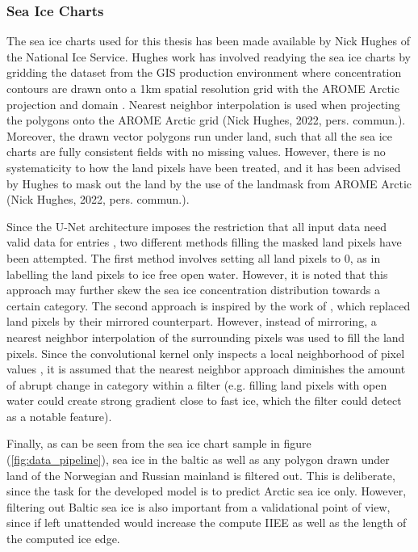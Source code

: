 \documentclass[../main/thesis]{subfiles}
\begin{document}
\subsubsection{Sea Ice Charts}
\label{sec:data_seaicecharts}
The sea ice charts used for this thesis has been made available by Nick Hughes of the National Ice Service. Hughes work has involved readying the sea ice charts by gridding the dataset from the GIS production environment \citep{Dinessen2020} where concentration contours are drawn onto a 1km spatial resolution grid with the AROME Arctic projection and domain \citep{Mueller2017}. Nearest neighbor interpolation is used when projecting the polygons onto the AROME Arctic grid (Nick Hughes, 2022, pers. commun.). Moreover, the drawn vector polygons run under land, such that all the sea ice charts are fully consistent fields with no missing values. However, there is no systematicity to how the land pixels have been treated, and it has been advised by Hughes to mask out the land by the use of the landmask from AROME Arctic (Nick Hughes, 2022, pers. commun.).

Since the U-Net architecture imposes the restriction that all input data need valid data for entries \citep{Ronneberger2015}, two different methods filling the masked land pixels have been attempted. The first method involves setting all land pixels to 0, as in labelling the land pixels to ice free open water. However, it is noted that this approach may further skew the sea ice concentration distribution towards a certain category. The second approach is inspired by the work of \citet{Wang2017}, which replaced land pixels by their mirrored counterpart. However, instead of mirroring, a nearest neighbor interpolation of the surrounding pixels was used to fill the land pixels. Since the convolutional kernel only inspects a local neighborhood of pixel values \citep{Yamashita2018}, it is assumed that the nearest neighbor approach diminishes the amount of abrupt change in category within a filter (e.g. filling land pixels with open water could create strong gradient close to fast ice, which the filter could detect as a notable feature).

Finally, as can be seen from the sea ice chart sample in figure (\ref{fig:data_pipeline}), sea ice in the baltic as well as any polygon drawn under land of the Norwegian and Russian mainland is filtered out. This is deliberate, since the task for the developed model is to predict Arctic sea ice only. However, filtering out Baltic sea ice is also important from a validational point of view, since if left unattended would increase the compute IIEE as well as the length of the computed ice edge.
\end{document}
